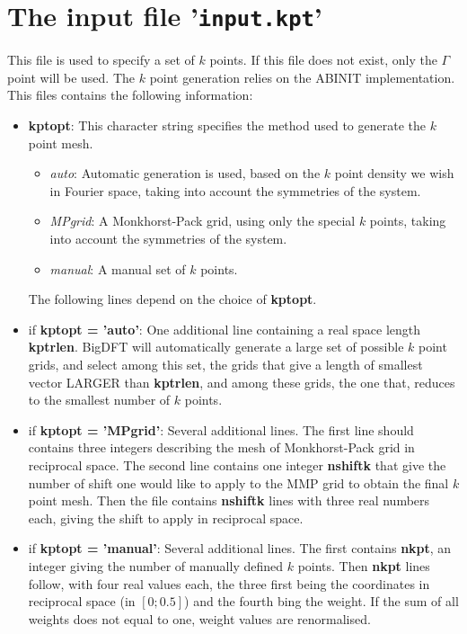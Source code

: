 \documentclass[a4paper,11pt]{report}
\begin{document}
\section{The input file '\texttt{input.kpt}'}
This file is used to specify a set of $k$ points. If this file does not exist, only the $\Gamma$ point will be used. The $k$ point generation relies on the ABINIT implementation. This files contains the following information:
\begin{itemize}
  \item  \textbf{kptopt}: This character string specifies the method used to generate the $k$ point mesh.
       \begin{itemize}
       \item  \emph{auto}: Automatic generation is used, based on the $k$ point density we wish in Fourier space, taking into account the symmetries of the system.
       \item  \emph{MPgrid}: A Monkhorst-Pack grid, using only the special $k$ points, taking into account the symmetries of the system.
       \item  \emph{manual}: A manual set of $k$ points.
       \end{itemize}
       The following lines depend on the choice of \textbf{kptopt}.
  \item  if \textbf{kptopt = 'auto'}: One additional line containing a real space length \textbf{kptrlen}. BigDFT will automatically generate a large set of possible $k$ point grids, and select among this set, the grids that give a length of smallest vector LARGER than \textbf{kptrlen}, and among these grids, the one that, reduces to the smallest number of $k$ points.
  \item  if \textbf{kptopt = 'MPgrid'}: Several additional lines. The first line should contains three integers describing the mesh of Monkhorst-Pack grid in reciprocal space. The second line contains one integer \textbf{nshiftk} that give the number of shift one would like to apply to the MMP grid to obtain the final $k$ point mesh. Then the file contains \textbf{nshiftk} lines with three real numbers each, giving the shift to apply in reciprocal space.
  \item  if \textbf{kptopt = 'manual'}: Several additional lines. The first contains \textbf{nkpt}, an integer giving the number of manually defined $k$ points. Then \textbf{nkpt} lines follow, with four real values each, the three first being the coordinates in reciprocal space (in $[0;0.5]$) and the fourth bing the weight. If the sum of all weights does not equal to one, weight values are renormalised.
\end{itemize}
\end{document}
